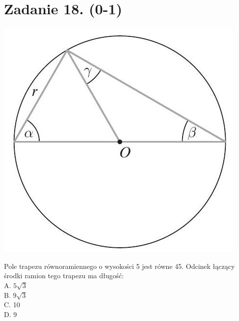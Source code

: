 \documentclass[10pt]{article}
\begin{document}
\section*{Zadanie 18. (0-1)}
\begin{center}
\includegraphics[max width=\textwidth]{2024_11_21_cdea326d19d0c2132b88g-06(2)}
\end{center}

Pole trapezu równoramiennego o wysokości 5 jest równe 45. Odcinek łączący środki ramion tego trapezu ma długość:\\
A. \(5 \sqrt{3}\)\\
B. \(9 \sqrt{3}\)\\
C. 10\\
D. 9
\end{document}
